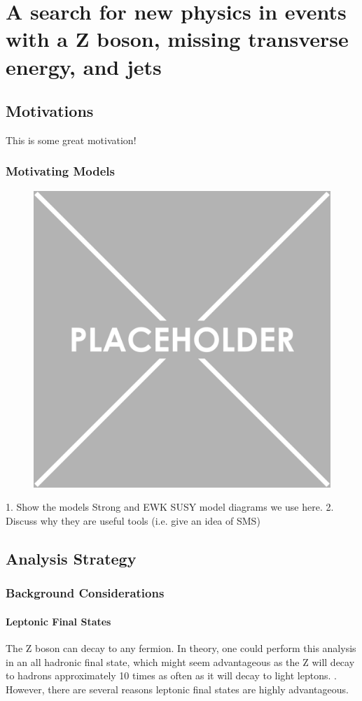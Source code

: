 \chapter{A search for new physics in events with a Z boson, missing transverse energy, and jets}

\section{Motivations}

This is some great motivation!

\subsection{Motivating Models} \label{sec:susy_models}

\begin{figure}[h!]
  \centering
  \includegraphics[width=.5\textwidth]{figures/placeholder.png}
  \caption{}
  \label{fig:SUSY-diagrams}
\end{figure}

1. Show the models Strong and EWK SUSY model diagrams we use here.
2. Discuss why they are useful tools (i.e. give an idea of SMS)

\section{Analysis Strategy}

\subsection{Background Considerations}

\subsubsection{Leptonic Final States} \label{sec:leptonic_final_states}
The Z boson can decay to any fermion. In theory, one could perform this analysis in an all hadronic final state, which might seem advantageous as the Z will decay to hadrons approximately 10 times as often as it will decay to light leptons. . However, there are several reasons leptonic final states are highly advantageous.

